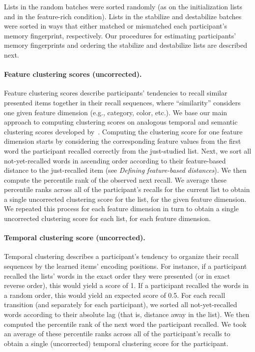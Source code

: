 \documentclass[11pt]{article}
\begin{document}
Lists in the random batches were sorted randomly (as on the initialization
lists and in the feature-rich condition). Lists in the stabilize and
destabilize batches were sorted in ways that either matched or mismatched each
participant's memory fingerprint, respectively. Our procedures for estimating
participants' memory fingerprints and ordering the stabilize and destabilize
lists are described next.

\paragraph*{Feature clustering scores (uncorrected).}

Feature clustering scores describe participants' tendencies to recall similar
presented items together in their recall sequences, where ``similarity''
considers one given feature dimension (e.g., category, color, etc.). We base
our main approach to computing clustering scores on analogous temporal and
semantic clustering scores developed by~\cite{PolyEtal09}. Computing the
clustering score for one feature dimension starts by considering the
corresponding feature values from the first word the participant recalled
correctly from the just-studied list. Next, we sort all not-yet-recalled words
in ascending order according to their feature-based distance to the
just-recalled item (see \textit{Defining feature-based distances}). We then
compute the percentile rank of the observed next recall. We average these
percentile ranks across all of the participant’s recalls for the current list
to obtain a single uncorrected clustering score for the list, for the given
feature dimension. We repeated this process for each feature dimension in turn
to obtain a single uncorrected clustering score for each list, for each feature
dimension.

\paragraph*{Temporal clustering score (uncorrected).}

Temporal clustering describes a participant's tendency to organize their recall
sequences by the learned items' encoding positions. For instance, if a
participant recalled the lists' words in the exact order they were presented
(or in exact reverse order), this would yield a score of 1. If a participant
recalled the words in a random order, this would yield an expected score of
0.5. For each recall transition (and separately for each participant), we
sorted all not-yet-recalled words according to their absolute lag (that is,
distance away in the list). We then computed the percentile rank of the next
word the participant recalled. We took an average of these percentile ranks
across all of the participant’s recalls to obtain a single (uncorrected)
temporal clustering score for the participant.
\end{document}
